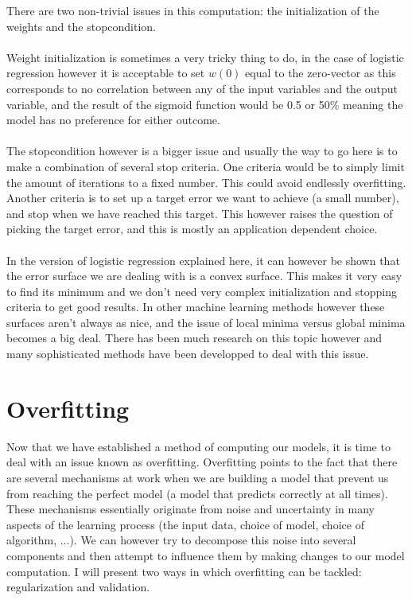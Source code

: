 There are two non-trivial issues in this computation: the initialization of the weights and the stopcondition. \\ \\
Weight initialization is sometimes a very tricky thing to do, in the case of logistic regression however it is acceptable to set $w(0)$ equal to the zero-vector as this corresponds to no correlation between any of the input variables and the output variable, and the result of the sigmoid function would be 0.5 or 50\% meaning the model has no preference for either outcome.\\ \\
The stopcondition however is a bigger issue and usually the way to go here is to make a combination of several stop criteria. One criteria would be to simply limit the amount of iterations to a fixed number. This could avoid endlessly overfitting. Another criteria is to set up a target error we want to achieve (a small number), and stop when we have reached this target. This however raises the question of picking the target error, and this is mostly an application dependent choice. \\ \\
In the version of logistic regression explained here, it can however be shown that the error surface we are dealing with is a convex surface\cite{convexerrorlogistic}. This makes it very easy to find its minimum and we don't need very complex initialization and stopping criteria to get good results. In other machine learning methods however these surfaces aren't always as nice, and the issue of local minima versus global minima becomes a big deal. There has been much research on this topic however and many sophisticated methods have been developped to deal with this issue.

\section{Overfitting}
\label{sec:glm-overfitting}
Now that we have established a method of computing our models, it is time to deal with an issue known as overfitting\cite{caltechmachinelearning}\cite{babyak2004you}. Overfitting points to the fact that there are several mechanisms at work when we are building a model that prevent us from reaching the perfect model (a model that predicts correctly at all times). These mechanisms essentially originate from noise and uncertainty in many aspects of the learning process (the input data, choice of model, choice of algorithm, ...). We can however try to decompose this noise into several components and then attempt to influence them by making changes to our model computation. I will present two ways in which overfitting can be tackled: regularization and validation.

